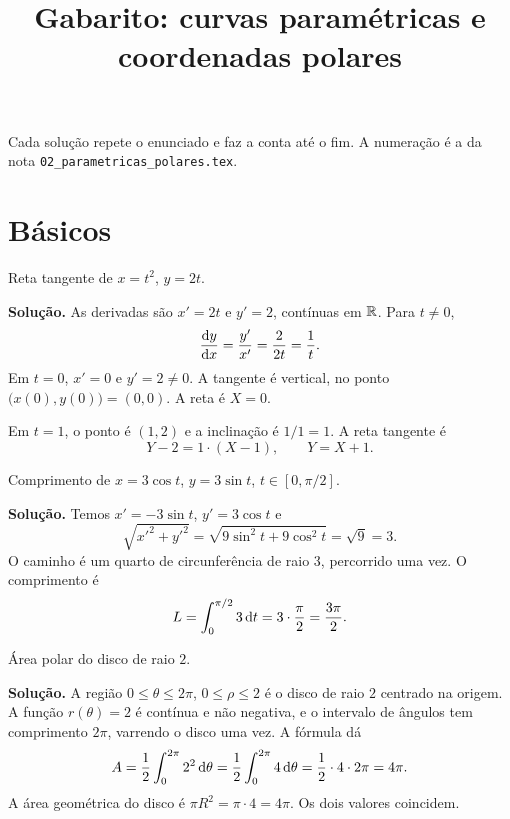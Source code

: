 \documentclass[11pt,a4paper]{article}
\title{Gabarito: curvas paramétricas e coordenadas polares}
\author{}
\date{}
\begin{document}
\maketitle
\tableofcontents

Cada solução repete o enunciado e faz a conta até o fim. A numeração é a da nota \texttt{02\_parametricas\_polares.tex}.

\section{Básicos}

\begin{exercicio}[Básico --- B1]
Reta tangente de \(x=t^{2}\), \(y=2t\).
\end{exercicio}

\noindent\textbf{Solução.}
As derivadas são \(x'=2t\) e \(y'=2\), contínuas em \(\mathbb{R}\). Para \(t\neq 0\),
\[
\frac{\mathrm{d} y}{\mathrm{d} x}=\frac{y'}{x'}=\frac{2}{2t}=\frac{1}{t}.
\]
Em \(t=0\), \(x'=0\) e \(y'=2\neq 0\). A tangente é vertical, no ponto \(\bigl(x(0),y(0)\bigr)=(0,0)\). A reta é \(X=0\).

Em \(t=1\), o ponto é \((1,2)\) e a inclinação é \(1/1=1\). A reta tangente é
\[
Y-2=1\cdot(X-1),\qquad Y=X+1.
\]

\begin{exercicio}[Básico --- B2]
Comprimento de \(x=3\cos t\), \(y=3\sin t\), \(t\in[0,\pi/2]\).
\end{exercicio}

\noindent\textbf{Solução.}
Temos \(x'=-3\sin t\), \(y'=3\cos t\) e
\[
\sqrt{x'^{2}+y'^{2}}
=\sqrt{9\sin^{2}t+9\cos^{2}t}
=\sqrt{9}=3.
\]
O caminho é um quarto de circunferência de raio \(3\), percorrido uma vez. O comprimento é
\[
L=\int_{0}^{\pi/2} 3\,\mathrm{d} t=3\cdot\frac{\pi}{2}=\frac{3\pi}{2}.
\]

\begin{exercicio}[Básico --- B3]
Área polar do disco de raio \(2\).
\end{exercicio}

\noindent\textbf{Solução.}
A região \(0\le\theta\le 2\pi\), \(0\le\rho\le 2\) é o disco de raio \(2\) centrado na origem. A função \(r(\theta)=2\) é contínua e não negativa, e o intervalo de ângulos tem comprimento \(2\pi\), varrendo o disco uma vez. A fórmula dá
\[
A=\frac12\int_{0}^{2\pi} 2^{2}\,\mathrm{d}\theta
=\frac12\int_{0}^{2\pi} 4\,\mathrm{d}\theta
=\frac12\cdot 4\cdot 2\pi
=4\pi.
\]
A área geométrica do disco é \(\pi R^{2}=\pi\cdot 4=4\pi\). Os dois valores coincidem.
\end{document}

